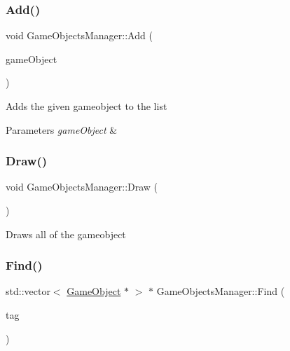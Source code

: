 \subsubsection{\texorpdfstring{Add()}{Add()}}
{\footnotesize\ttfamily void Game\+Objects\+Manager\+::\+Add (\begin{DoxyParamCaption}\item[{\mbox{\hyperlink{class_game_object}{Game\+Object}} $\ast$}]{game\+Object }\end{DoxyParamCaption})}



Adds the given gameobject to the list 


\begin{DoxyParams}{Parameters}
{\em game\+Object} & \\
\hline
\end{DoxyParams}
\mbox{\label{class_game_objects_manager_a60c1378f98fbef5dc98c8fdd094ef3c9}} 
\subsubsection{\texorpdfstring{Draw()}{Draw()}}
{\footnotesize\ttfamily void Game\+Objects\+Manager\+::\+Draw (\begin{DoxyParamCaption}{ }\end{DoxyParamCaption})}



Draws all of the gameobject 

\mbox{\label{class_game_objects_manager_a242d9459669f0d2e13df6f98c1c04b8a}} 
\subsubsection{\texorpdfstring{Find()}{Find()}}
{\footnotesize\ttfamily std\+::vector$<$ \mbox{\hyperlink{class_game_object}{Game\+Object}} $\ast$ $>$ $\ast$ Game\+Objects\+Manager\+::\+Find (\begin{DoxyParamCaption}\item[{std\+::string}]{tag }\end{DoxyParamCaption})}



